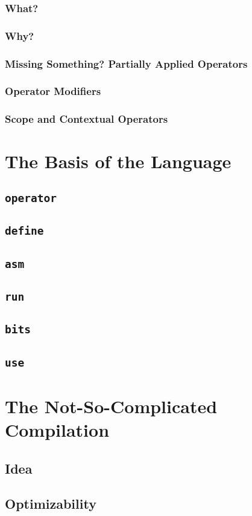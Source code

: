 \documentclass{article}
\begin{document}
\subsubsection{What?}

\subsubsection{Why?}

\subsubsection{Missing Something? Partially Applied Operators}

\subsubsection{Operator Modifiers}

\subsubsection{Scope and Contextual Operators}

\section{The Basis of the Language}
\subsection{\texttt{\textbf{operator}}}

\subsection{\texttt{\textbf{define}}}

\subsection{\texttt{\textbf{asm}}}

\subsection{\texttt{\textbf{run}}}

\subsection{\texttt{\textbf{bits}}}

\subsection{\texttt{\textbf{use}}}

\section{The Not-So-Complicated Compilation}
\subsection{Idea}

\subsection{Optimizability}
\end{document}
